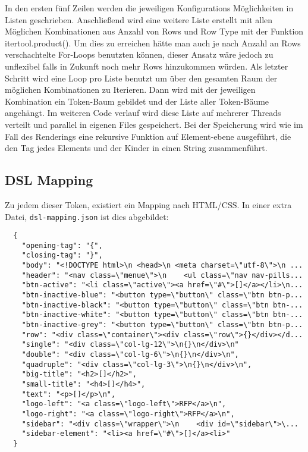 \documentclass[pdftex,a4paper,halfparskip]{scrartcl}
\begin{document}
In den ersten fünf Zeilen werden die jeweiligen Konfigurations Möglichkeiten in Listen geschrieben. Anschließend wird eine weitere Liste erstellt mit allen Möglichen Kombinationen aus Anzahl von Rows und Row Type mit der Funktion itertool.product(). Um dies zu erreichen hätte man auch je nach Anzahl an Rows verschachtelte For-Loops benutzten können, dieser Ansatz wäre jedoch zu unflexibel falls in Zukunft noch mehr Rows hinzukommen würden.
Als letzter Schritt wird eine Loop pro Liste benutzt um über den gesamten Raum der möglichen Kombinationen zu Iterieren. Dann wird mit der jeweiligen Kombination ein Token-Baum gebildet und der Liste aller Token-Bäume angehängt. Im weiteren Code verlauf wird diese Liste auf mehrerer Threads verteilt und parallel in eigenen Files gespeichert.
Bei der Speicherung wird wie im Fall des Renderings eine rekursive Funktion auf Element-ebene ausgeführt, die den Tag jedes Elements und der Kinder in einen String zusammenführt.

\subsection{DSL Mapping}

Zu jedem dieser Token, existiert ein Mapping nach HTML/CSS. In einer extra Datei, \texttt{dsl-mapping.json} ist dies abgebildet:

\begin{verbatim}
  {
    "opening-tag": "{",
    "closing-tag": "}",
    "body": "<!DOCTYPE html>\n <head>\n <meta charset=\"utf-8\">\n ...
    "header": "<nav class=\"menue\">\n    <ul class=\"nav nav-pills...
    "btn-active": "<li class=\"active\"><a href=\"#\">[]</a></li>\n...
    "btn-inactive-blue": "<button type=\"button\" class=\"btn btn-p...
    "btn-inactive-black": "<button type=\"button\" class=\"btn btn-...
    "btn-inactive-white": "<button type=\"button\" class=\"btn btn-...
    "btn-inactive-grey": "<button type=\"button\" class=\"btn btn-p...
    "row": "<div class=\"container\"><div class=\"row\">{}</div></d...
    "single": "<div class=\"col-lg-12\">\n{}\n</div>\n"
    "double": "<div class=\"col-lg-6\">\n{}\n</div>\n",
    "quadruple": "<div class=\"col-lg-3\">\n{}\n</div>\n",
    "big-title": "<h2>[]</h2>",
    "small-title": "<h4>[]</h4>",
    "text": "<p>[]</p>\n",
    "logo-left": "<a class=\"logo-left\">RFP</a>\n",
    "logo-right": "<a class=\"logo-right\">RFP</a>\n",
    "sidebar": "<div class=\"wrapper\">\n    <div id=\"sidebar\">\...
    "sidebar-element": "<li><a href=\"#\">[]</a><li>"  
  }
  
\end{verbatim}
\end{document}
